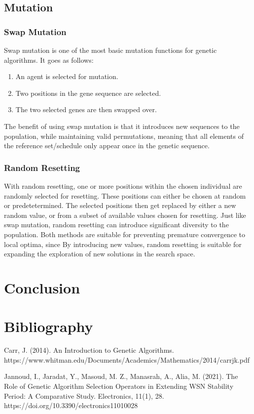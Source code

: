 \documentclass{article}
\begin{document}
\bigskip
\subsection{Mutation}
\bigskip
\subsubsection{Swap Mutation}
Swap mutation is one of the most basic mutation functions for genetic algorithms. It goes as follows:
\begin{enumerate}
  \item An agent is selected for mutation.
  \item Two positions in the gene sequence are selected.
  \item The two selected genes are then swapped over.
\end{enumerate}
\smallskip
The benefit of using swap mutation is that it introduces new sequences to the population, while maintaining valid permutations, meaning that all elements of the reference set/schedule only appear once in the genetic sequence.
\bigskip
\subsubsection{Random Resetting}
With random resetting, one or more positions within the chosen individual are randomly selected for resetting. These positions can either be chosen at random or predetetermined. The selected positions then get replaced by either a new random value, or from a subset of available values chosen for resetting.
\smallskip
Just like swap mutation, random resetting can introduce significant diversity to the population. Both methods are suitable for preventing premature convergence to local optima, since 
By introducing new values, random resetting is suitable for expanding the exploration of new solutions in the search space.
\newpage
\section{Conclusion}

\newpage
\section{Bibliography}
Carr, J. (2014). An Introduction to Genetic Algorithms.\smallbreak
https://www.whitman.edu/Documents/Academics/Mathematics/2014/carrjk.pdf

Jannoud, I., Jaradat, Y., Masoud, M. Z., Manasrah, A., Alia, M. (2021). The Role of Genetic Algorithm Selection Operators in Extending WSN Stability Period: A Comparative Study. Electronics, 11(1), 28. https://doi.org/10.3390/electronics11010028‌
\end{document}
